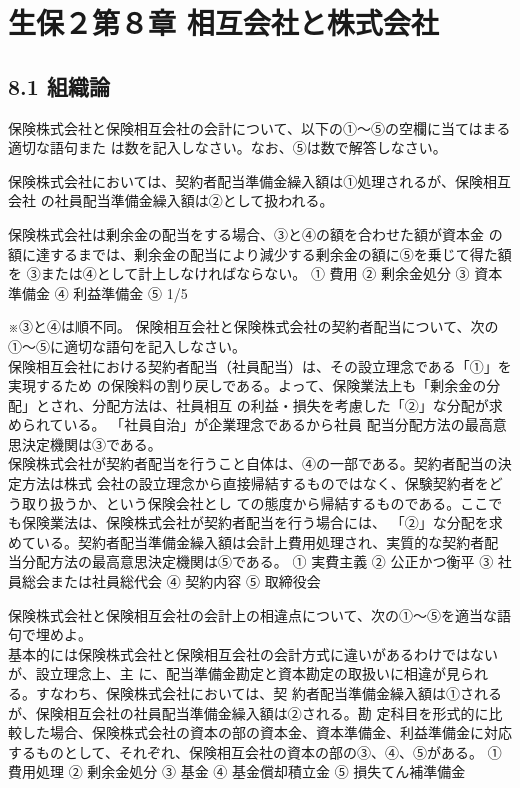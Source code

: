 \documentclass[report,gutter=10mm,fore-edge=10mm,uplatex,dvipdfmx]{jlreq}
\begin{document}
\chapter{生保２第８章 相互会社と株式会社}
\section{8.1 組織論}
保険株式会社と保険相互会社の会計について、以下の①～⑤の空欄に当てはまる適切な語句また
は数を記入しなさい。なお、⑤は数で解答しなさい。

保険株式会社においては、契約者配当準備金繰入額は①処理されるが、保険相互会社
の社員配当準備金繰入額は②として扱われる。

保険株式会社は剰余金の配当をする場合、③と④の額を合わせた額が資本金
の額に達するまでは、剰余金の配当により減少する剰余金の額に⑤を乗じて得た額を
③または④として計上しなければならない。
① 費用  ② 剰余金処分  ③ 資本準備金  ④ 利益準備金  ⑤ 1/5

※③と④は順不同。
保険相互会社と保険株式会社の契約者配当について、次の①～⑤に適切な語句を記入しなさい。\\
保険相互会社における契約者配当（社員配当）は、その設立理念である「①」を実現するため
の保険料の割り戻しである。よって、保険業法上も「剰余金の分配」とされ、分配方法は、社員相互
の利益・損失を考慮した「②」な分配が求められている。
「社員自治」が企業理念であるから社員
配当分配方法の最高意思決定機関は③である。\\
保険株式会社が契約者配当を行うこと自体は、④の一部である。契約者配当の決定方法は株式
会社の設立理念から直接帰結するものではなく、保験契約者をどう取り扱うか、という保険会社とし
ての態度から帰結するものである。ここでも保険業法は、保険株式会社が契約者配当を行う場合には、
「②」な分配を求めている。契約者配当準備金繰入額は会計上費用処理され、実質的な契約者配
当分配方法の最高意思決定機関は⑤である。
① 実費主義 
② 公正かつ衡平 
③ 社員総会または社員総代会 
④ 契約内容 
⑤ 取締役会

保険株式会社と保険相互会社の会計上の相違点について、次の①～⑤を適当な語句で埋めよ。\\
基本的には保険株式会社と保険相互会社の会計方式に違いがあるわけではないが、設立理念上、主
に、配当準備金勘定と資本勘定の取扱いに相違が見られる。すなわち、保険株式会社においては、契
約者配当準備金繰入額は①されるが、保険相互会社の社員配当準備金繰入額は②される。勘
定科目を形式的に比較した場合、保険株式会社の資本の部の資本金、資本準備金、利益準備金に対応
するものとして、それぞれ、保険相互会社の資本の部の③、④、⑤がある。
① 費用処理 
② 剰余金処分 
③ 基金 
④ 基金償却積立金 
⑤ 損失てん補準備金 
\end{document}
